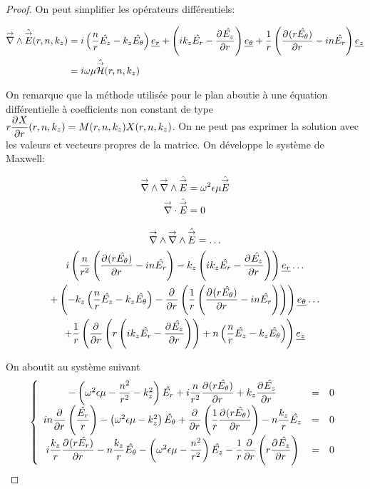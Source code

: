     \begin{proof}

        On peut simplifier les opérateurs différentiels:

        \begin{align}
            \vrot \hat \vE(r,n,k_z) &= i\left(\frac{n}{r}\hat{E_z} - k_z\hat{E_\theta}\right)\v{e_r} + 
            \left(ik_z\hat{E_r} - \ddr{r}{\hat{E_z}}\right)\v{e_\theta} +
            \frac{1}{r}\left(\ddr{r}{(r\hat{E_\theta})}-in\hat{E_r}\right)\v{e_z}
            \\
            &=i\w\mu \hat \vH(r,n,k_z)
        \end{align}

        On remarque que la méthode utilisée pour le plan aboutie à une équation différentielle à coefficients non constant de type $r\ddr{r}{X}(r,n,k_z) = M(r,n,k_z)X(r,n,k_z)$. On ne peut pas exprimer la solution avec les valeurs et vecteurs propres de la matrice. 
        On développe le système de Maxwell:

        \begin{align}
            \vrot \vrot \hat \vE &= \w^2\eps\mu \hat \vE
            \\
            \vdiv \hat \vE &= 0
        \end{align}

        \begin{multline}
            \vrot \vrot \hat \vE = \dots\\
            i\left(\frac{n}{r^2}\left(\ddr{r}{(r\hat{E_\theta})} - in\hat{E_r}\right) - k_z\left(ik_z\hat{E_r} - \ddr{r}{\hat{E_z}}\right)\right)    \v{e_r} \dots\\ 
            + \left(-k_z\left(\frac{n}{r}\hat{E_z} - k_z\hat{E_\theta}\right) -\ddr{r}{}\left(\frac{1}{r}\left(\ddr{r}{(r\hat{E_\theta})}-in\hat{E_r}\right)\right)\right)    \v{e_\theta} \dots\\
            + \frac{1}{r}\left(\ddr{r}{} \left(r\left(ik_z\hat{E_r} - \ddr{r}{\hat{E_z}}\right)\right) + n \left(\frac{n}{r}\hat{E_z} - k_z\hat{E_\theta}\right)\right) \v{e_z}
        \end{multline}

        On aboutit au système suivant
        \begin{equation}
            \left\lbrace
            \begin{array}{ccc}
                -\left(\w^2\eps\mu -\frac{n^2}{r^2}  - k_z^2\right)\hat{E_r}  +i\frac{n}{r^2}\ddr{r}{(r\hat{E_\theta})}  +k_z\ddr{r}{\hat{E_z}} & = & 0\\
                in\ddr{r}{}\left(\frac{\hat{E_r}}{r}\right) -\left(\w^2\eps\mu - k_z^2\right)\hat{E_\theta} + \ddr{r}{}\left(\frac{1}{r}\ddr{r}{(r\hat{E_\theta})}\right)  - n\frac{k_z}{r}\hat{E_z} & = & 0\\
                i\frac{k_z}{r}\ddr{r}{(r\hat{E_r})}  - n\frac{k_z}{r}\hat{E_\theta}  -\left(\w^2\eps\mu - \frac{n^2}{r^2} \right)\hat{E_z} - \frac{1}{r}\ddr{r}{}\left(r\ddr{r}{\hat{E_z}}\right) & = & 0
            \end{array}
            \right.
        \end{equation}


\end{proof}
